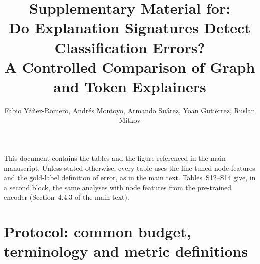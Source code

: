 \documentclass[3p,times,10pt,nopreprintline]{elsarticle}
\begin{document}
\begin{frontmatter}
\title{Supplementary Material for:\\
Do Explanation Signatures Detect Classification Errors?\\
A Controlled Comparison of Graph and Token Explainers}
\author{Fabio Y\'a\~nez-Romero, Andr\'es Montoyo, Armando Su\'arez, Yoan Guti\'errez, Ruslan Mitkov}
\end{frontmatter}

\noindent This document contains the tables and the figure referenced in the main manuscript. Unless stated otherwise, every table uses the fine-tuned node features and the gold-label definition of error, as in the main text. Tables~S12--S14 give, in a second block, the same analyses with node features from the pre-trained encoder (Section~4.4.3 of the main text).

\section{Protocol: common budget, terminology and metric definitions}
\end{document}
